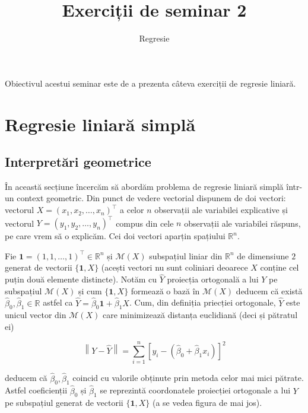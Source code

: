 \documentclass[]{article}
\title{Exerciții de seminar 2}
\subtitle{Regresie}
\author{}
\date{}
\begin{document}
\maketitle

\thispagestyle{fancy}

Obiectivul acestui seminar este de a prezenta câteva exerciții de
regresie liniară.

\section{Regresie liniară simplă}\label{regresie-liniara-simpla}

\subsection{Interpretări geometrice}\label{interpretari-geometrice}

În această secțiune încercăm să abordăm problema de regresie liniară
simplă într-un context geometric. Din punct de vedere vectorial dispunem
de doi vectori: vectorul \(X = (x_1, x_2, \ldots, x_n)^\intercal\) a
celor \(n\) observații ale variabilei explicative și vectorul
\(Y = (y_1, y_2, \ldots, y_n)^\intercal\) compus din cele \(n\)
observații ale variabilei răspuns, pe care vrem să o explicăm. Cei doi
vectori aparțin spațiului \(\mathbb{R}^n\).

Fie \(\mathbf{1} = (1,1,\ldots,1)^\intercal\in\mathbb{R}^n\) și
\(\mathcal{M}(X)\) subspațiul liniar din \(\mathbb{R}^n\) de dimensiune
\(2\) generat de vectorii \(\{\mathbf{1}, X\}\) (acești vectori nu sunt
coliniari deoarece \(X\) conține cel puțin două elemente distincte).
Notăm cu \(\hat Y\) proiecția ortogonală a lui \(Y\) pe subspațiul
\(\mathcal{M}(X)\) și cum \(\{\mathbf{1}, X\}\) formează o bază în
\(\mathcal{M}(X)\) deducem că există
\(\hat\beta_0, \hat\beta_1\in \mathbb{R}\) astfel ca
\(\hat Y = \hat\beta_0\mathbf{1} + \hat\beta_1 X\). Cum, din definiția
priecției ortogonale, \(\hat Y\) este unicul vector din
\(\mathcal{M}(X)\) care minimizează distanța euclidiană (deci și
pătratul ei)

\[
\left\lVert Y - \hat Y \right\rVert = \sum_{i = 1}^{n}[y_i - (\hat\beta_0 + \hat \beta_1 x_i)]^2
\]

deducem că \(\hat\beta_0, \hat\beta_1\) coincid cu valorile obținute
prin metoda celor mai mici pătrate. Astfel coeficienții \(\hat\beta_0\)
și \(\hat\beta_1\) se reprezintă coordonatele proiecției ortogonale a
lui \(Y\) pe subspațiul generat de vectorii \(\{\mathbf{1}, X\}\) (a se
vedea figura de mai jos).
\end{document}
